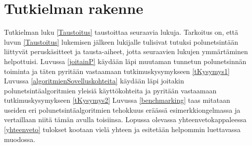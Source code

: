 \section{Tutkielman rakenne}\label{tRakenne}
Tutkielman luku \ref{Taustoitus} taustoittaa seuraavia lukuja. Tarkoitus on, 
että luvun \ref{Taustoitus} lukemisen jälkeen lukijalle tulisivat tutuksi 
polunetsintään liittyvät peruskäsitteet ja tausta-aiheet, jotta seuraavien 
lukujen ymmärtäminen helpottuisi. Luvussa \ref{joitainP} käydään läpi 
muutaman tunnetun polunetsinnän toiminta ja täten pyritään vastaamaan 
tutkimuskysymykseen \ref{tKysymys1} Luvussa 
\ref{algoritmienSovelluskohteita} käydään läpi joitakin 
polunetsintäalgoritmien yleisiä käyttökohteita ja pyritään vastaamaan 
tutkimuskysymykseen \ref{tKysymys2} Luvussa \ref{benchmarking} taas mitataan 
useiden eri polunetsintäalgoritmien tehokkuus eräässä esimerkkiongelmassa ja 
vertaillaan niitä tämän avulla toisiinsa. Lopussa olevassa 
yhteenvetokappaleessa \ref{yhteenveto} tulokset kootaan vielä yhteen ja 
esitetään helpommin luettavassa muodossa.
